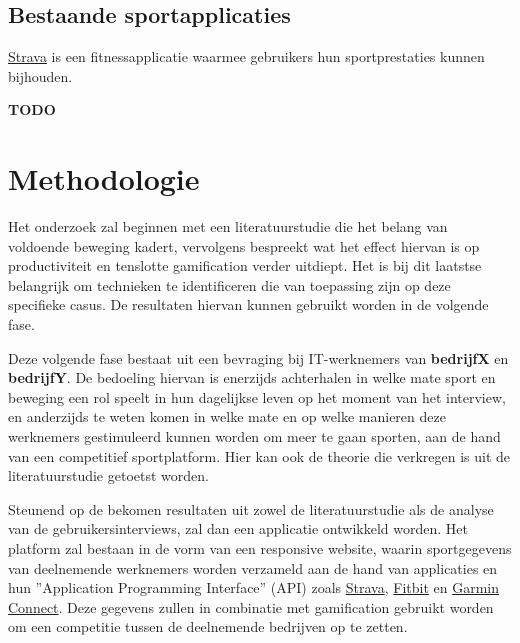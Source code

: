 \subsection{Bestaande sportapplicaties}

\href{https://www.strava.com/}{Strava} is een fitnessapplicatie waarmee gebruikers hun sportprestaties kunnen bijhouden. \textcite{Barratt2017}

\textbf{TODO}




\section{Methodologie}
\label{sec:methodologie}

Het onderzoek zal beginnen met een literatuurstudie die het belang van voldoende beweging kadert, vervolgens bespreekt wat het effect hiervan is op productiviteit en tenslotte gamification verder uitdiept. Het is bij dit laatstse belangrijk om technieken te identificeren die van toepassing zijn op deze specifieke casus. De resultaten hiervan kunnen gebruikt worden in de volgende fase.

Deze volgende fase bestaat uit een bevraging bij IT-werknemers van \textbf{bedrijfX} en \textbf{bedrijfY}. De bedoeling hiervan is enerzijds achterhalen in welke mate sport en beweging een rol speelt in hun dagelijkse leven op het moment van het interview, en anderzijds te weten komen in welke mate en op welke manieren deze werknemers gestimuleerd kunnen worden om meer te gaan sporten, aan de hand van een competitief sportplatform. Hier kan ook de theorie die verkregen is uit de literatuurstudie getoetst worden.

Steunend op de bekomen resultaten uit zowel de literatuurstudie als de analyse van de gebruikersinterviews, zal dan een applicatie ontwikkeld worden. Het platform zal bestaan in de vorm van een responsive website, waarin sportgegevens van deelnemende werknemers worden verzameld aan de hand van applicaties en hun ''Application Programming Interface'' (API) zoals \href{https://developers.strava.com/}{Strava}, \href{https://dev.fitbit.com/}{Fitbit} en \href{https://developer.garmin.com/gc-developer-program/overview/}{Garmin Connect}. Deze gegevens zullen in combinatie met gamification gebruikt worden om een competitie tussen de deelnemende bedrijven op te zetten.

